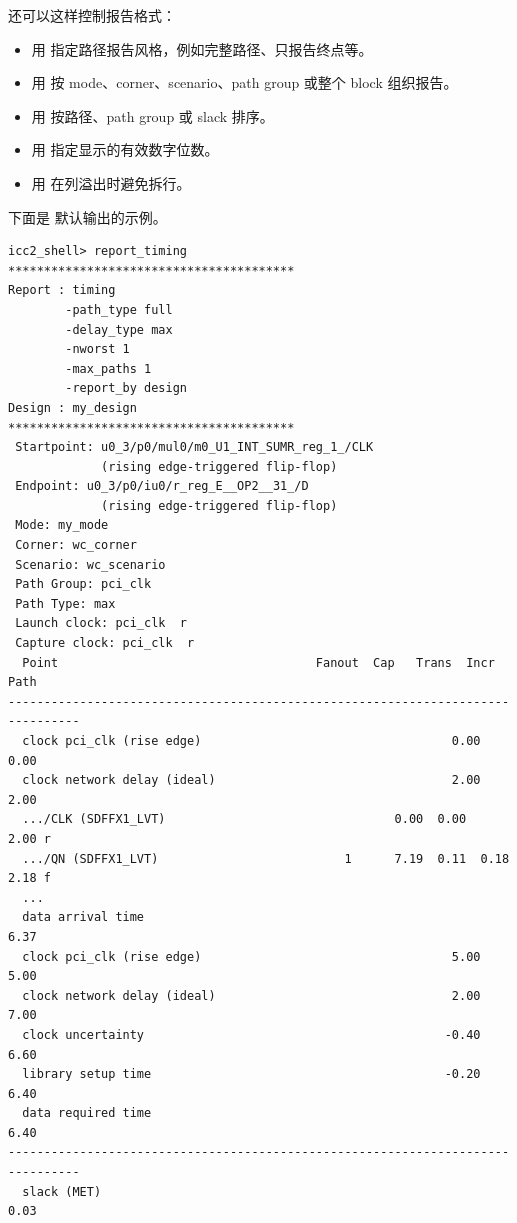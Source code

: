 还可以这样控制报告格式：
\begin{itemize}
  \item 用  指定路径报告风格，例如完整路径、只报告终点等。
  \item 用  按 mode、corner、scenario、path group 或整个 block 组织报告。
  \item 用  按路径、path group 或 slack 排序。
  \item 用  指定显示的有效数字位数。
  \item 用  在列溢出时避免拆行。
\end{itemize}

下面是  默认输出的示例。

\begin{lstlisting}[caption={report\_timing 报告示例}]
icc2_shell> report_timing
****************************************
Report : timing
        -path_type full
        -delay_type max
        -nworst 1
        -max_paths 1
        -report_by design
Design : my_design
****************************************
 Startpoint: u0_3/p0/mul0/m0_U1_INT_SUMR_reg_1_/CLK
             (rising edge-triggered flip-flop)
 Endpoint: u0_3/p0/iu0/r_reg_E__OP2__31_/D
             (rising edge-triggered flip-flop)
 Mode: my_mode
 Corner: wc_corner
 Scenario: wc_scenario
 Path Group: pci_clk
 Path Type: max
 Launch clock: pci_clk  r
 Capture clock: pci_clk  r
  Point                                    Fanout  Cap   Trans  Incr   Path
--------------------------------------------------------------------------------
  clock pci_clk (rise edge)                                   0.00   0.00
  clock network delay (ideal)                                 2.00   2.00
  .../CLK (SDFFX1_LVT)                                0.00  0.00   2.00 r
  .../QN (SDFFX1_LVT)                          1      7.19  0.11  0.18   2.18 f
  ...
  data arrival time                                                  6.37
  clock pci_clk (rise edge)                                   5.00   5.00
  clock network delay (ideal)                                 2.00   7.00
  clock uncertainty                                          -0.40   6.60
  library setup time                                         -0.20   6.40
  data required time                                                 6.40
--------------------------------------------------------------------------------
  slack (MET)                                                        0.03
\end{lstlisting}

